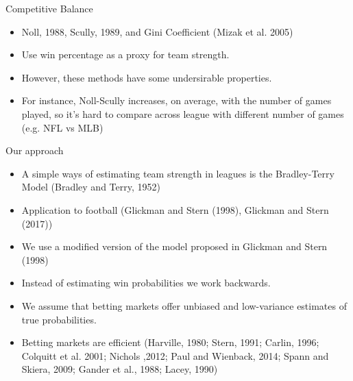 \documentclass{beamer}\usepackage[]{graphicx}\usepackage[]{color}
\begin{document}
\begin{frame}{Competitive Balance}
\begin{itemize}
\item Noll, 1988, Scully, 1989, and Gini Coefficient (Mizak et al. 2005)
\item Use win percentage as a proxy for team strength.  
\item However, these methods have some undersirable properties.  
\item For instance, Noll-Scully increases, on average, with the number of games played, so it's hard to compare across league with different number of games (e.g. NFL vs MLB)
\end{itemize}
\end{frame}

\begin{frame}{Our approach}
\begin{itemize}
\item A simple ways of estimating team strength in leagues is the Bradley-Terry Model (Bradley and Terry, 1952) 
\item Application to football (Glickman and Stern (1998), Glickman and Stern (2017))
\item We use a modified version of the model proposed in Glickman and Stern (1998)
\item Instead of estimating win probabilities we work backwards.  
\item We assume that betting markets offer unbiased and low-variance estimates of true probabilities.  
\item Betting markets are efficient (Harville, 1980; Stern, 1991; Carlin, 1996; Colquitt et al. 2001; Nichols ,2012; Paul and Wienback, 2014; Spann and Skiera, 2009; Gander et al., 1988; Lacey, 1990)
\end{itemize}
\end{frame}


\end{document}
